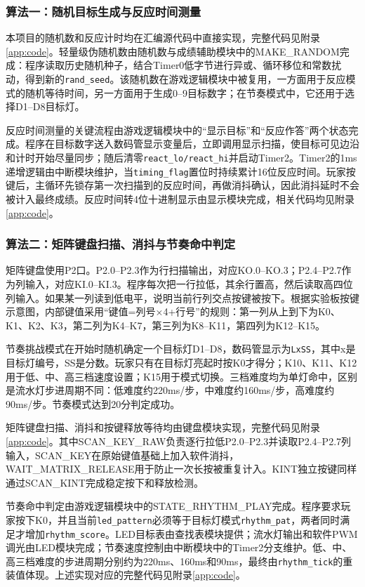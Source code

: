 ﻿\documentclass[UTF8,a4paper,12pt]{ctexart}
\begin{document}
\subsubsection*{算法一：随机目标生成与反应时间测量}
本项目的随机数和反应计时均在汇编源代码中直接实现，完整代码见附录\ref{app:code}。轻量级伪随机数由随机数与成绩辅助模块中的MAKE\_RANDOM完成：程序读取历史随机种子，结合Timer0低字节进行异或、循环移位和常数扰动，得到新的\texttt{rand\_seed}。该随机数在游戏逻辑模块中被复用，一方面用于反应模式的随机等待时间，另一方面用于生成0--9目标数字；在节奏模式中，它还用于选择D1--D8目标灯。

反应时间测量的关键流程由游戏逻辑模块中的“显示目标”和“反应作答”两个状态完成。程序在目标数字送入数码管显示变量后，立即调用显示扫描，使目标可见边沿和计时开始尽量同步；随后清零\texttt{react\_lo/react\_hi}并启动Timer2。Timer2的1ms递增逻辑由中断模块维护，当\texttt{timing\_flag}置位时持续累计16位反应时间。玩家按键后，主循环先锁存第一次扫描到的反应时间，再做消抖确认，因此消抖延时不会被计入最终成绩。反应时间转4位十进制显示由显示模块完成，相关代码均见附录\ref{app:code}。

\subsubsection*{算法二：矩阵键盘扫描、消抖与节奏命中判定}
矩阵键盘使用P2口。P2.0--P2.3作为行扫描输出，对应KO.0--KO.3；P2.4--P2.7作为列输入，对应KI.0--KI.3。程序每次把一行拉低，其余行置高，然后读取高四位列输入。如果某一列读到低电平，说明当前行列交点按键被按下。根据实验板按键示意图，内部键值采用“键值=列号×4+行号”的规则：第一列从上到下为K0、K1、K2、K3，第二列为K4--K7，第三列为K8--K11，第四列为K12--K15。

节奏挑战模式在开始时随机确定一个目标灯D1--D8，数码管显示为\texttt{LxSS}，其中x是目标灯编号，SS是分数。玩家只有在目标灯亮起时按K0才得分；K10、K11、K12用于低、中、高三档速度设置；K15用于模式切换。三档难度均为单灯命中，区别是流水灯步进周期不同：低难度约220ms/步，中难度约160ms/步，高难度约90ms/步。节奏模式达到20分判定成功。

矩阵键盘扫描、消抖和按键释放等待均由键盘模块实现，完整代码见附录\ref{app:code}。其中SCAN\_KEY\_RAW负责逐行拉低P2.0--P2.3并读取P2.4--P2.7列输入，SCAN\_KEY在原始键值基础上加入软件消抖，WAIT\_MATRIX\_RELEASE用于防止一次长按被重复计入。KINT独立按键同样通过SCAN\_KINT完成稳定按下和释放检测。

节奏命中判定由游戏逻辑模块中的STATE\_RHYTHM\_PLAY完成。程序要求玩家按下K0，并且当前\texttt{led\_pattern}必须等于目标灯模式\texttt{rhythm\_pat}，两者同时满足才增加\texttt{rhythm\_score}。LED目标表由查找表模块提供；流水灯输出和软件PWM调光由LED模块完成；节奏速度控制由中断模块中的Timer2分支维护。低、中、高三档难度的步进周期分别约为220ms、160ms和90ms，最终由\texttt{rhythm\_tick}的重装值体现。上述实现对应的完整代码见附录\ref{app:code}。
\end{document}
